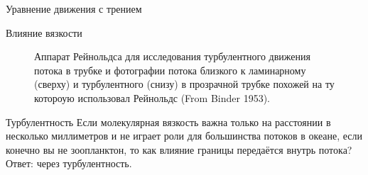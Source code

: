 \begin{chapter}{Уравнение движения с трением}
\begin{section}{Влияние вязкости}
\begin{figure}[t!]
\caption{Аппарат Рейнольдса для исследования турбулентного движения
потока в трубке и фотографии потока близкого к ламинарному (сверху) и
турбулентного (снизу) в прозрачной трубке похожей на ту котороую
использовал Рейнольдс (From Binder 1953).}
\label{fig:reynoldsexp}
\end{figure}
%
\end{section}

\begin{section}{Турбулентность}
Если молекулярная вязкость важна только на расстоянии в несколько
миллиметров и не играет роли для большинства потоков в океане, если
конечно вы не зоопланктон, то как влияние границы передаётся внутрь
потока? Ответ: через турбулентность.
%


\end{section}
\end{chapter}
